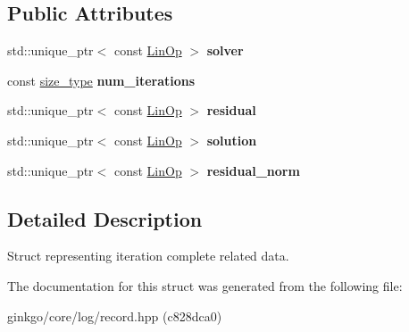 \subsection*{Public Attributes}
\begin{DoxyCompactItemize}
\item 
\mbox{\label{structgko_1_1log_1_1iteration__complete__data_af485c2d5eff3114076e057b9870106a8}} 
std\+::unique\+\_\+ptr$<$ const \hyperlink{classgko_1_1LinOp}{Lin\+Op} $>$ {\bfseries solver}
\item 
\mbox{\label{structgko_1_1log_1_1iteration__complete__data_a8d5fd7bf89def95a904e95b3f0848594}} 
const \hyperlink{namespacegko_a6e5c95df0ae4e47aab2f604a22d98ee7}{size\+\_\+type} {\bfseries num\+\_\+iterations}
\item 
\mbox{\label{structgko_1_1log_1_1iteration__complete__data_a52473dac8d5ac7849b6dbd7523cdeb37}} 
std\+::unique\+\_\+ptr$<$ const \hyperlink{classgko_1_1LinOp}{Lin\+Op} $>$ {\bfseries residual}
\item 
\mbox{\label{structgko_1_1log_1_1iteration__complete__data_a232f312a1a4c2f8817e208ec2013c454}} 
std\+::unique\+\_\+ptr$<$ const \hyperlink{classgko_1_1LinOp}{Lin\+Op} $>$ {\bfseries solution}
\item 
\mbox{\label{structgko_1_1log_1_1iteration__complete__data_a26a787138ac7faeced0420c5d02371cb}} 
std\+::unique\+\_\+ptr$<$ const \hyperlink{classgko_1_1LinOp}{Lin\+Op} $>$ {\bfseries residual\+\_\+norm}
\end{DoxyCompactItemize}


\subsection{Detailed Description}
Struct representing iteration complete related data. 

The documentation for this struct was generated from the following file\+:\begin{DoxyCompactItemize}
\item 
ginkgo/core/log/record.\+hpp (c828dca0)\end{DoxyCompactItemize}
